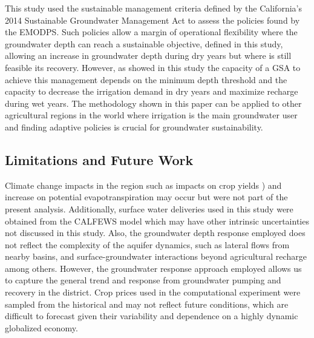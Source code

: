 \documentclass[a4paper,fleqn]{cas-sc}
\begin{document}
This study used the sustainable management criteria defined by the California’s 2014 Sustainable Groundwater Management Act to assess the policies found by the EMODPS. Such policies allow a margin of operational flexibility where the groundwater depth can reach a sustainable objective, defined in this study, allowing an increase in groundwater depth during dry years but where is still feasible its recovery. However, as showed in this  study the capacity of a GSA to achieve this management depends on the minimum depth threshold and the capacity to decrease the irrigation demand in dry years and maximize recharge during wet years. The methodology shown in this paper can be applied to other agricultural regions in the world where irrigation is the main groundwater user and finding adaptive policies is crucial for groundwater sustainability. 

\subsection{Limitations and Future Work}

Climate change impacts in the region such as impacts on crop yields \citep{blanc_is_2017}) and increase on potential evapotranspiration \citep{mcevoy_projected_2020,vahmani_will_2022} may occur but were not part of the present analysis. Additionally, surface water deliveries used in this study were obtained from the CALFEWS model \citep{zeff_californias_2021} which may have other intrinsic uncertainties not discussed in this study. Also, the groundwater depth response employed does not reflect the complexity of the aquifer dynamics, such as lateral flows from nearby basins, and surface-groundwater interactions beyond agricultural recharge among others. However, the groundwater response approach employed allows us to capture the general trend and response from groundwater pumping and recovery in the district. Crop prices used in the computational experiment were sampled from the historical and may not reflect future conditions, which are difficult to forecast given their variability and dependence on a highly dynamic globalized economy. 
\end{document}
